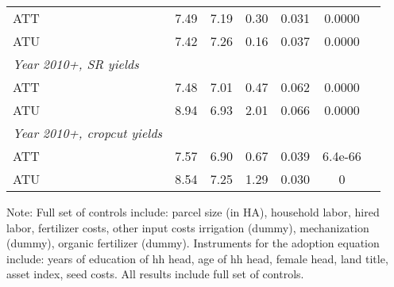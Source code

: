 \begin{table}[H]
\begin{threeparttable}
\begin{tabular}{l cccccc}
ATT         &        7.49&        7.19&        0.30&       0.031&      0.0000\\
%
%
%
ATU         &        7.42&        7.26&        0.16&       0.037&      0.0000\\
%
%
%
\textit{Year 2010+, SR yields}&            &            &            &            &            \\
ATT         &        7.48&        7.01&        0.47&       0.062&      0.0000\\
%
%
%
ATU         &        8.94&        6.93&        2.01&       0.066&      0.0000\\
%
%
%
\textit{Year 2010+, cropcut yields}&            &            &            &            &            \\
ATT         &        7.57&        6.90&        0.67&       0.039&     6.4e-66\\
%
%
%
ATU         &        8.54&        7.25&        1.29&       0.030&           0\\
\hline
\hline
\end{tabular}
\begin{tablenotes}
\footnotesize
\item{Note: Full set of controls include: parcel size (in HA), household labor, hired labor, fertilizer costs, other input costs irrigation (dummy), mechanization (dummy), organic fertilizer (dummy). Instruments for the adoption equation include: years of education of hh head, age of hh head, female head, land title, asset index, seed costs. All results include full set of controls. }
\end{tablenotes}
\end{threeparttable}
\end{table}
